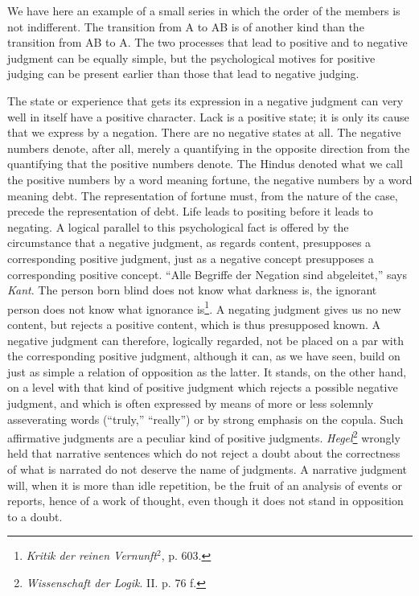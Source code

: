 \documentclass[12pt,a4paper]{book}
\newcommand{\opage}[1]{\marginnote{\footnotesize\textit{[#1]}}}
\begin{document}
\opage{77}We have here an example of a small series in which the order of the
members is not indifferent. The transition from A to AB is of another kind
than the transition from AB to A. The two processes that lead to positive
and to negative judgment can be equally simple, but the psychological
motives for positive judging can be present earlier than those that lead
to negative judging.

The state or experience that gets its expression in a negative judgment
can very well in itself have a positive character. Lack is a positive
state; it is only its cause that we express by a negation. There are no
negative states at all. The negative numbers denote, after all, merely a
quantifying in the opposite direction from the quantifying that the
positive numbers denote. The Hindus denoted what we call the positive
numbers by a word meaning fortune, the negative numbers by a word meaning
debt. The representation of fortune must, from the nature of the case,
precede the representation of debt. Life leads to positing before it leads
to negating. A logical parallel to this psychological fact is offered by
the circumstance that a negative judgment, as regards content, presupposes
a corresponding positive judgment, just as a negative concept presupposes
a corresponding positive concept. ``Alle Begriffe der Negation sind
abgeleitet,'' says \emph{Kant}. The person born blind does not know what
darkness is, the ignorant person does not know what ignorance
is\footnote{\emph{Kritik der reinen Vernunft}$^2$, p. 603.}. A negating
judgment gives us no new content, but rejects a positive content, which
is thus presupposed known. A negative judgment can therefore, logically
regarded, not be placed on a par with the corresponding positive judgment,
although it can, as we have seen, build on just as simple a relation of
opposition as the latter. It stands, on the other hand, on a level with
that kind of positive judgment which rejects a possible negative judgment,
and which is often expressed by means of more or less solemnly
asseverating words (``truly,'' ``really'') or by strong emphasis on the
copula. Such affirmative judgments are a peculiar kind of positive
judgments. \emph{Hegel}\footnote{\emph{Wissenschaft der Logik}. II. p. 76
f.} wrongly held that narrative \opage{78}sentences which do not reject a doubt
about the correctness of what is narrated do not deserve the name of
judgments. A narrative judgment will, when it is more than idle
repetition, be the fruit of an analysis of events or reports, hence of a
work of thought, even though it does not stand in opposition to a doubt.
\end{document}
